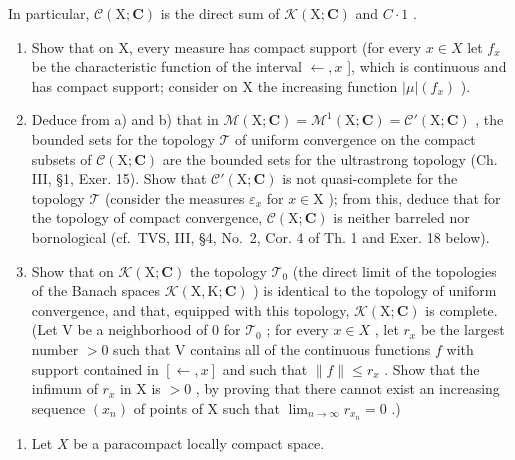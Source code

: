 In particular, \(\mathcal{C}(\mathrm{X};\mathbf{C})\) is the direct sum of \(\mathcal{K}(\mathrm{X};\mathbf{C})\) and \(C\cdot1\) .

\begin{enumerate}
\def\labelenumi{\alph{enumi})}
\setcounter{enumi}{1}
\item
  Show that on X, every measure has compact support (for every \(x \in X\) let \(f_x\) be the characteristic function of the interval \(\leftarrow, x\) {]}, which is continuous and has compact support; consider on X the increasing function \(|\mu|(f_x)\) ).
\item
  Deduce from a) and b) that in \(\mathcal{M}(\mathrm{X};\mathbf{C}) = \mathcal{M}^{1}(\mathrm{X};\mathbf{C}) = \mathcal{C}'(\mathrm{X};\mathbf{C})\) , the bounded sets for the topology \(\mathcal{T}\) of uniform convergence on the compact subsets of \(\mathcal{C}(\mathrm{X};\mathbf{C})\) are the bounded sets for the ultrastrong topology (Ch. III, §1, Exer. 15). Show that \(\mathcal{C}'(\mathrm{X};\mathbf{C})\) is not quasi-complete for the topology \(\mathcal{T}\) (consider the measures \(\varepsilon_{x}\) for \(x\in \mathrm{X}\) ); from this, deduce that for the topology of compact convergence, \(\mathcal{C}(\mathrm{X};\mathbf{C})\) is neither barreled nor bornological (cf.~TVS, III, §4, No.~2, Cor. 4 of Th. 1 and Exer. 18 below).
\item
  Show that on \(\mathcal{K}(\mathrm{X};\mathbf{C})\) the topology \(\mathcal{T}_0\) (the direct limit of the topologies of the Banach spaces \(\mathcal{K}(\mathrm{X},\mathrm{K};\mathbf{C})\) ) is identical to the topology of uniform convergence, and that, equipped with this topology, \(\mathcal{K}(\mathrm{X};\mathbf{C})\) is complete. (Let V be a neighborhood of 0 for \(\mathcal{T}_0\) ; for every \(x\in X\) , let \(r_x\) be the largest number \(>0\) such that V contains all of the continuous functions \(f\) with support contained in \([ \leftarrow ,x]\) and such that \(\| f\| \leqslant r_x\) . Show that the infimum of \(r_x\) in X is \(>0\) , by proving that there cannot exist an increasing sequence \((x_n)\) of points of X such that \(\lim_{n\to \infty}r_{x_n} = 0\) .)
\end{enumerate}

\begin{enumerate}
\def\labelenumi{\arabic{enumi})}
\setcounter{enumi}{17}
\tightlist
\item
  Let \(X\) be a paracompact locally compact space.
\end{enumerate}


